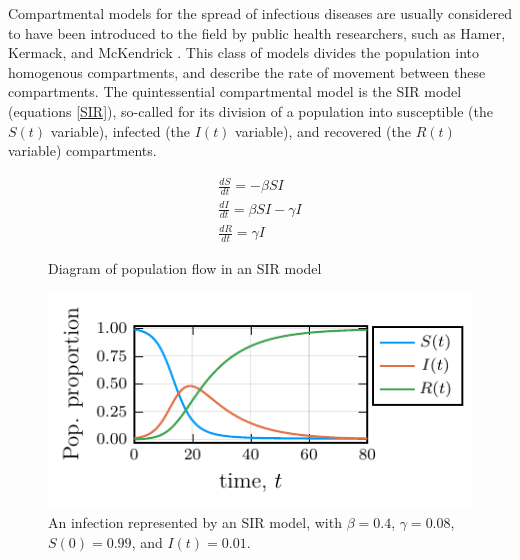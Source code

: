 Compartmental models for the spread of infectious diseases are usually considered to have been introduced to the field by public health researchers, such as Hamer, Kermack, and McKendrick \cite{hamer1906epidemic, kermack1927contribution, brauer2019mathematical,edelstein2005mathematical}. This class of models divides the population into homogenous compartments, and describe the rate of movement between these compartments. The quintessential compartmental model is the SIR model (equations \ref{SIR}), so-called for its division of a population into susceptible (the $S(t)$ variable), infected (the $I(t)$ variable), and recovered (the $R(t)$ variable) compartments. 

\begin{eqnarray}
    \frac{dS}{dt} = -\beta S I  \\
    \frac{dI}{dt} = \beta S I - \gamma I\\
    \frac{dR}{dt} = \gamma I \label{SIR} 
\end{eqnarray}

\begin{figure}
    \begin{minipage}[c]{0.4\textwidth}
    \centering
        \caption{Diagram of population flow in an SIR model}
        \label{SIR_diagram}
    \end{minipage}\hfill
    \begin{minipage}[c]{0.55\textwidth}
        \centering
        \includegraphics{chapter_0/sir.pdf}
        \caption{An infection represented by an SIR model, with $\beta = 0.4$, $\gamma = 0.08$, $S(0) = 0.99$, and $I(t) = 0.01$.}
        \label{SIR_plots}
    \end{minipage}
\end{figure}


